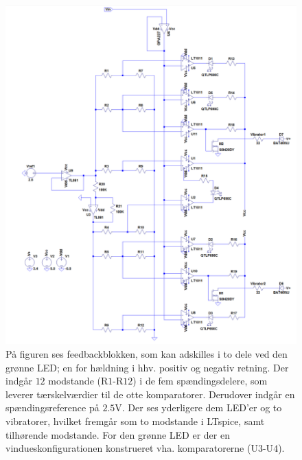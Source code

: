\begin{figure}[H] 
	\centering
	\includegraphics[scale=0.35]{figures/cProblemloesning/komparator_uden_vaerdi.PNG}
	\caption{På figuren ses feedbackblokken, som kan adskilles i to dele ved den grønne LED; en for hældning i hhv. positiv og negativ retning. Der indgår $12$ modstande (R$1$-R$12$) i de fem spændingsdelere, som leverer tærskelværdier til de otte komparatorer. Derudover indgår en spændingsreference på $2.5$V. Der ses yderligere dem LED'er og to vibratorer, hvilket fremgår som to modstande i LTspice, samt tilhørende modstande. For den grønne LED er der en vindueskonfigurationen konstrueret vha. komparatorerne (U$3$-U$4$).}
	\label{fig:komparator_uden_vaerdi}
\end{figure}

